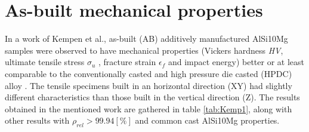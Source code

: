 \section{As-built mechanical properties}
\label{MMABMP}
In a work of Kempen et al., as-built (AB) additively manufactured AlSi10Mg samples were observed to have mechanical properties (Vickers hardness \textit{HV}, ultimate tensile stress $\sigma_u$ , fracture strain $\epsilon_f$ and impact energy) better or at least comparable to the conventionally casted and high pressure die casted (HPDC) alloy \parencite{KEMPEN2012439}. The tensile specimens built in an horizontal direction (XY) had slightly different characteristics than those built in the vertical direction (Z). The results obtained in the mentioned work are gathered in table \ref{tab:Kemp1}, along with other results with $\rho_{rel}>99.94[\%]$ and common cast AlSi10Mg properties.

 \begin{center}
\begin{table}[ht]
\noindent{}
\caption[Mechanical properties of SLM built parts and cast + aged parts in literature]{Mechanical properties of SLM built parts and cast + aged parts in literature}
\label{tab:Kemp1}
\end{table}
 \end{center}
 
